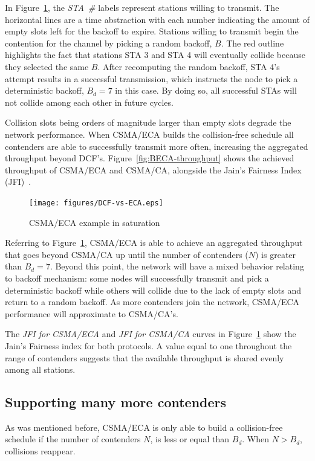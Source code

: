 \documentclass[a4paper,journal]{IEEEtran}
\begin{document}
In Figure~\ref{fig:BECA}, the \emph{STA~\#} labels represent stations willing to transmit. The horizontal lines are a time abstraction with each number indicating the amount of empty slots left for the backoff to expire. Stations willing to transmit begin the contention for the channel by picking a random backoff, $B$. The red outline highlights the fact that stations STA 3 and STA 4 will eventually collide because they selected the same $B$. After recomputing the random backoff, STA 4's attempt results in a successful transmission, which instructs the node to pick a deterministic backoff, $B_{d}=7$ in this case. By doing so, all successful STAs will not collide among each other in future cycles.

Collision slots being orders of magnitude larger than empty slots degrade the network performance. When CSMA/ECA builds the collision-free schedule all contenders are able to successfully transmit more often, increasing the aggregated throughput beyond DCF's. Figure~\ref{fig:BECA-throughput} shows the achieved throughput of CSMA/ECA and CSMA/CA, alongside the Jain's Fairness Index (JFI)~\cite{JFI}.

\begin{figure}[htbp]
\centering
  \texttt{[image: figures/DCF-vs-ECA.eps]}
  \caption{CSMA/ECA example in saturation}
  \label{fig:BECA}
\end{figure}

Referring to Figure~\ref{fig:BECA}, CSMA/ECA is able to achieve an aggregated throughput that goes beyond CSMA/CA up until the number of contenders ($N$) is greater than $B_{d}=7$. Beyond this point, the network will have a mixed behavior relating to backoff mechanism: some nodes will successfully transmit and pick a deterministic backoff while others will collide due to the lack of empty slots and return to a random backoff. As more contenders join the network, CSMA/ECA performance will approximate to CSMA/CA's.

The \emph{JFI for CSMA/ECA} and \emph{JFI for CSMA/CA} curves in Figure~\ref{fig:BECA} show the Jain's Fairness index for both protocols. A value equal to one throughout the range of contenders suggests that the available throughput is shared evenly among all stations.

	\subsection{Supporting many more contenders}
	As was mentioned before, CSMA/ECA is only able to build a collision-free schedule if the number of contenders $N$, is less or equal than $B_{d}$. When $N > B_{d}$, collisions reappear. 
	
\end{document}
